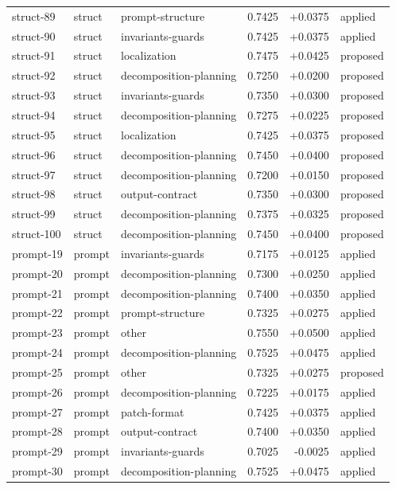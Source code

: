 \begin{center}
\begin{longtable}{llp{5.2cm}rrl}
struct-89 & struct & prompt-structure & 0.7425 & +0.0375 & applied \\
struct-90 & struct & invariants-guards & 0.7425 & +0.0375 & applied \\
struct-91 & struct & localization & 0.7475 & +0.0425 & proposed \\
struct-92 & struct & decomposition-planning & 0.7250 & +0.0200 & proposed \\
struct-93 & struct & invariants-guards & 0.7350 & +0.0300 & proposed \\
struct-94 & struct & decomposition-planning & 0.7275 & +0.0225 & proposed \\
struct-95 & struct & localization & 0.7425 & +0.0375 & proposed \\
struct-96 & struct & decomposition-planning & 0.7450 & +0.0400 & proposed \\
struct-97 & struct & decomposition-planning & 0.7200 & +0.0150 & proposed \\
struct-98 & struct & output-contract & 0.7350 & +0.0300 & proposed \\
struct-99 & struct & decomposition-planning & 0.7375 & +0.0325 & proposed \\
struct-100 & struct & decomposition-planning & 0.7450 & +0.0400 & proposed \\
prompt-19 & prompt & invariants-guards & 0.7175 & +0.0125 & applied \\
prompt-20 & prompt & decomposition-planning & 0.7300 & +0.0250 & applied \\
prompt-21 & prompt & decomposition-planning & 0.7400 & +0.0350 & applied \\
prompt-22 & prompt & prompt-structure & 0.7325 & +0.0275 & applied \\
prompt-23 & prompt & other & 0.7550 & +0.0500 & applied \\
prompt-24 & prompt & decomposition-planning & 0.7525 & +0.0475 & applied \\
prompt-25 & prompt & other & 0.7325 & +0.0275 & proposed \\
prompt-26 & prompt & decomposition-planning & 0.7225 & +0.0175 & applied \\
prompt-27 & prompt & patch-format & 0.7425 & +0.0375 & applied \\
prompt-28 & prompt & output-contract & 0.7400 & +0.0350 & applied \\
prompt-29 & prompt & invariants-guards & 0.7025 & -0.0025 & applied \\
prompt-30 & prompt & decomposition-planning & 0.7525 & +0.0475 & applied \\

\end{longtable}
\end{center}

